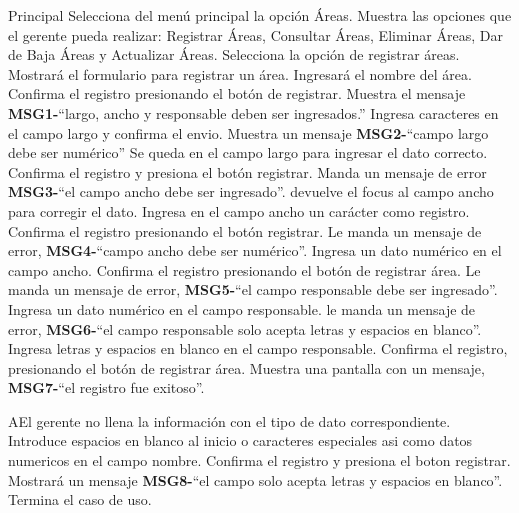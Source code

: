 	\begin{UCtrayectoria}{Principal}
		\UCpaso[\UCactor] Selecciona del menú principal la opción Áreas.
		\UCpaso Muestra las opciones que el gerente pueda realizar: Registrar Áreas, Consultar Áreas, Eliminar Áreas, Dar de Baja Áreas y Actualizar Áreas.
		\UCpaso[\UCactor] Selecciona la opción de registrar áreas.
		\UCpaso Mostrará el formulario para registrar un área.		
		\UCpaso[\UCactor] Ingresará el nombre del área.
		\UCpaso[\UCactor] Confirma el registro presionando el botón de registrar.
		\UCpaso Muestra el mensaje {\bf MSG1-}``largo, ancho y responsable deben ser ingresados.'' 	
		\UCpaso[\UCactor] Ingresa caracteres en el campo largo y confirma el envio.
		\UCpaso Muestra un mensaje {\bf MSG2-}``campo largo debe ser numérico''
		\UCpaso Se queda en el campo largo para ingresar el dato correcto.
		\UCpaso[\UCactor] Confirma el registro y presiona el botón registrar.
		\UCpaso Manda un mensaje de error {\bf MSG3-}``el campo ancho debe ser ingresado''.
		\UCpaso devuelve el focus al campo ancho para corregir el dato.
		\UCpaso[\UCactor] Ingresa en el campo ancho un carácter como registro.
		\UCpaso[\UCactor] Confirma el registro presionando el botón registrar.
		\UCpaso Le manda un mensaje de error, {\bf MSG4-}``campo ancho debe ser numérico''.
		\UCpaso[\UCactor] Ingresa un dato numérico en el campo ancho.
		\UCpaso[\UCactor] Confirma el registro presionando el botón  de registrar área.
		\UCpaso Le manda un mensaje de error, {\bf MSG5-}``el campo responsable debe ser ingresado''.
		\UCpaso[\UCactor] Ingresa un dato numérico en el campo responsable.
		\UCpaso le manda un mensaje de error, {\bf MSG6-}``el campo responsable solo acepta letras y espacios en blanco''. 
		\UCpaso[\UCactor] Ingresa letras y espacios en blanco en el campo responsable.
		\UCpaso[\UCactor] Confirma el registro, presionando el botón de registrar área.
		\UCpaso Muestra una pantalla con un mensaje, {\bf MSG7-}``el registro fue exitoso''.
	\end{UCtrayectoria}
		
		\begin{UCtrayectoriaA}{A}{El gerente no llena la información con el tipo de dato correspondiente.}
			\UCpaso[\UCactor] Introduce espacios en blanco al inicio o caracteres especiales asi como datos numericos en el campo nombre.
			\UCpaso[\UCactor] Confirma el registro y presiona el boton registrar.
			\UCpaso Mostrará un mensaje  {\bf MSG8-}``el campo solo acepta letras y espacios en blanco''.
			\UCpaso[] Termina el caso de uso.
		\end{UCtrayectoriaA}
